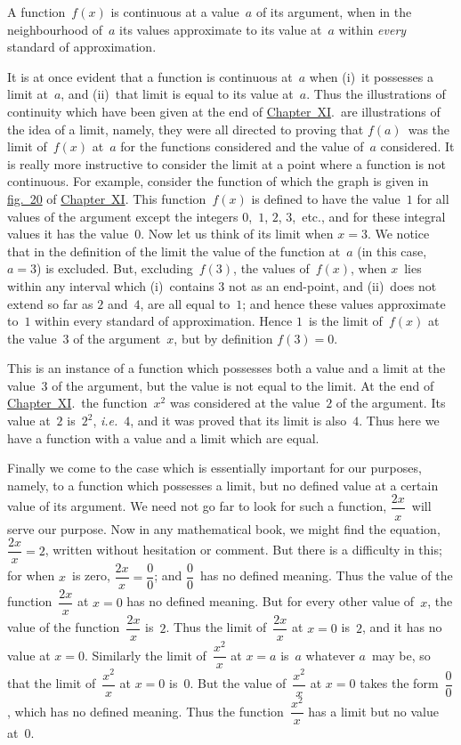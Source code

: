 \documentclass[12pt,leqno]{book}[2005/09/16]
\newcommand{\Chg}[2]{#2}
\newcommand{\Fig}[2][Fig.]{\hyperref[fig:#2]{#1~#2}}
\newcommand{\ChapRef}[2][Chapter]{\hyperref[chapter:#2]{\Chg{#1}{Chapter}~#2}}
\newcommand{\PageSep}[1]{\ignorespaces}
\newcommand{\ie}{\emph{i.e.}}
\begin{document}
A function~$f(x)$ is continuous at a value~$a$
of its argument, when in the neighbourhood
of~$a$ its values approximate to its value at~$a$
within \emph{every} standard of approximation.

It is at once evident that a function is continuous
at~$a$ when (i)~it possesses a limit at~$a$,
and (ii)~that limit is equal to its value at~$a$.
Thus the illustrations of continuity which
have been given at the end of \ChapRef{XI}.\ are
illustrations of the idea of a limit, namely,
they were all directed to proving that $f(a)$~was
the limit of~$f(x)$ at~$a$ for the functions
considered and the value of~$a$ considered. It
is really more instructive to consider the
limit at a point where a function is not continuous.
For example, consider the function
of which the graph is given in \Fig[fig.]{20} of \ChapRef{XI}.
This function~$f(x)$ is defined to have
the value~$1$ for all values of the argument
except the integers $0$,~$1$, $2$, $3$,~etc., and for these
integral values it has the value~$0$. Now let
us think of its limit when $x = 3$. We notice
that in the definition of the limit the value
of the function at~$a$ (in this case, $a = 3$) is excluded.
But, excluding~$f(3)$, the values of~$f(x)$,
when $x$~lies within any interval which
(i)~contains $3$ not as an end-point, and (ii)~does
not extend so far as $2$ and~$4$, are all
equal to~$1$; and hence these values approximate
to~$1$ within every standard of approximation.
Hence $1$~is the limit of~$f(x)$ at the
\PageSep{231}
value~$3$ of the argument~$x$, but by definition
$f(3) = 0$.

This is an instance of a function which
possesses both a value and a limit at the
value~$3$ of the argument, but the value is not
equal to the limit. At the end of \ChapRef{XI}.\
the function~$x^{2}$ was considered at the
value~$2$ of the argument. Its value at~$2$ is~$2^{2}$,
\ie~$4$, and it was proved that its limit is also~$4$.
Thus here we have a function with a
value and a limit which are equal.

Finally we come to the case which is essentially
important for our purposes, namely, to
a function which possesses a limit, but no
defined value at a certain value of its argument.
We need not go far to look for
such a function, $\dfrac{2x}{x}$~will serve our purpose.
Now in any mathematical book, we might
find the equation, $\dfrac{2x}{x} = 2$, written without
hesitation or comment. But there is a difficulty
in this; for when $x$~is zero, $\dfrac{2x}{x} = \dfrac{0}{0}$; and
$\dfrac{0}{0}$~has no defined meaning. Thus the value
of the function~$\dfrac{2x}{x}$ at $x = 0$ has no defined
\PageSep{232}
meaning. But for every other value of~$x$,
the value of the function~$\dfrac{2x}{x}$ is~$2$. Thus the
limit of~$\dfrac{2x}{x}$ at $x = 0$ is~$2$, and it has no value
at $x = 0$. Similarly the limit of~$\dfrac{x^{2}}{x}$ at $x = a$ is~$a$
whatever $a$~may be, so that the limit of~$\dfrac{x^{2}}{x}$
at $x = 0$ is~$0$. But the value of~$\dfrac{x^{2}}{x}$ at $x = 0$
takes the form~$\dfrac{0}{0}$, which has no defined
meaning. Thus the function~$\dfrac{x^{2}}{x}$ has a limit
but no value at~$0$.
\end{document}
